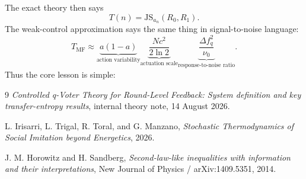 \documentclass[11pt,a4paper]{article}
\newcommand{\JS}{\mathrm{JS}}
\newcommand{\1}{\mathbbm{1}}
\begin{document}
The exact theory then says
\[
\boxed{
T(n)=\JS_{a_n}(R_0,R_1).}
\]
The weak-control approximation says the same thing in signal-to-noise language:
\[
\boxed{
T_{\mathrm{MF}}
\approx
\underbrace{a(1-a)}_{\text{action variability}}
\underbrace{\frac{Nc^2}{2\ln2}}_{\text{actuation scale}}
\underbrace{\frac{\Delta f_q^2}{\nu_0}}_{\text{response-to-noise ratio}}.}
\]
Thus the core lesson is simple:

\begin{center}
\end{center}

\newpage
\begin{thebibliography}{9}
\emph{Controlled q-Voter Theory for Round-Level Feedback: System definition and key transfer-entropy results}, internal theory note, 14 August 2026.

L. Irisarri, L. Trigal, R. Toral, and G. Manzano,
\emph{Stochastic Thermodynamics of Social Imitation beyond Energetics}, 2026.

J. M. Horowitz and H. Sandberg,
\emph{Second-law-like inequalities with information and their interpretations}, New Journal of Physics / arXiv:1409.5351, 2014.
\end{thebibliography}
\end{document}
